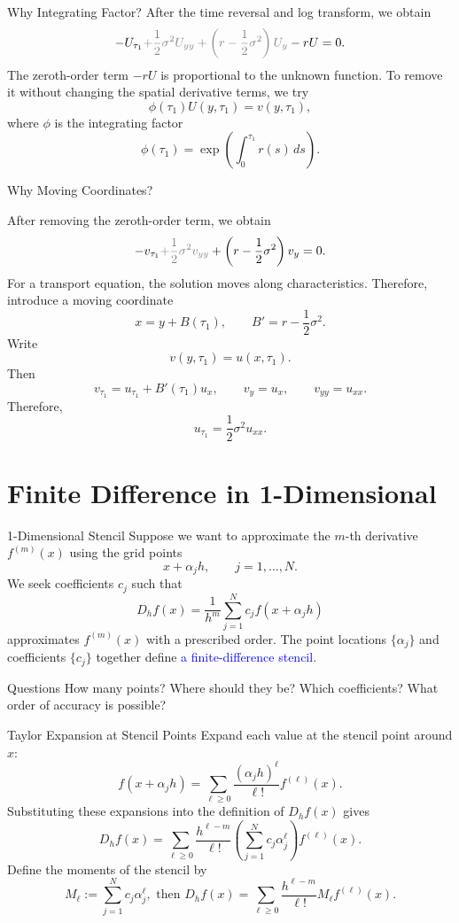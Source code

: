 \documentclass{beamer}
\begin{document}
\begin{frame}{Why Integrating Factor?}
After the time reversal and log transform, we obtain
\[
- U_{\tau_1}\textcolor{gray}{+
\frac{1}{2}\sigma^2U_{yy}
+
\left(r-\frac{1}{2}\sigma^2\right)U_y}
-rU=0.
\]
The zeroth-order term \(-rU\) is proportional to the unknown function.
To remove it without changing the spatial derivative terms, we try
\[
\phi(\tau_1)U(y,\tau_1)=v(y,\tau_1),
\]
where \(\phi\) is the integrating factor
\[
\boxed{
\phi(\tau_1)
=
\exp\left(\int_0^{\tau_1}r(s)\,ds\right)}.
\]
\end{frame}


\begin{frame}{Why Moving Coordinates?}

After removing the zeroth-order term, we obtain
\[
-v_{\tau_1}
\textcolor{gray}{+\frac{1}{2}\sigma^2v_{yy}
}+\left(r-\frac{1}{2}\sigma^2\right)v_y=0.
\]
For a transport equation, the solution moves along characteristics.
Therefore, introduce a moving coordinate
\[
x=y+B(\tau_1),
\qquad
B'=r-\frac{1}{2}\sigma^2.
\]
Write
\[
v(y,\tau_1)=u(x,\tau_1).
\]
Then
\[
v_{\tau_1}=u_{\tau_1}+B'(\tau_1)u_x,
\qquad
v_y=u_x,
\qquad
v_{yy}=u_{xx}.
\]
Therefore,
\[
u_{\tau_1}
=
\frac{1}{2}\sigma^2u_{xx}.
\]
\end{frame}




\section[A2Q2]{Finite Difference in 1-Dimensional}

\begin{frame}{1-Dimensional Stencil}
Suppose we want to approximate the \(m\)-th derivative \(f^{(m)}(x)\)
using the grid points
\[
x+\alpha_j h,\qquad j=1,\ldots,N.
\]
We seek coefficients \(c_j\) such that
\[
D_h f(x)
=
\frac{1}{h^m}
\sum_{j=1}^{N}
c_j f(x+\alpha_j h)
\]
approximates \(f^{(m)}(x)\) with a prescribed order. The point locations \(\{\alpha_j\}\) and coefficients \(\{c_j\}\)
together define \textcolor{blue}{a finite-difference stencil}.
\begin{block}{Questions}
How many points? Where should they be? Which coefficients?
What order of accuracy is possible?
\end{block}

\end{frame}

\begin{frame}{Taylor Expansion at Stencil Points}
Expand each value at the stencil point around \(x\):
\[
f(x+\alpha_j h)
=
\sum_{\ell\ge 0}
\frac{(\alpha_j h)^\ell}{\ell!}
f^{(\ell)}(x).
\]
Substituting these expansions into the definition of \(D_h f(x)\) gives
\[
D_h f(x)
=
\sum_{\ell\ge 0}
\frac{h^{\ell-m}}{\ell!}
\left(
\sum_{j=1}^{N}c_j\alpha_j^\ell
\right)
f^{(\ell)}(x).
\]
Define the moments of the stencil by
\[
M_\ell
:=
\sum_{j=1}^{N}c_j\alpha_j^\ell, \text{ then } D_h f(x)
=
\sum_{\ell\ge 0}
\frac{h^{\ell-m}}{\ell!}
M_\ell f^{(\ell)}(x).
\]

\end{frame}
\end{document}
